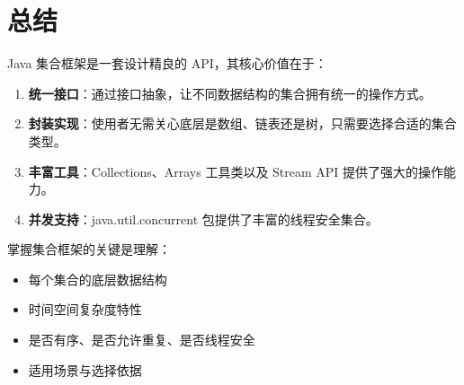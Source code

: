 
\section{总结}
Java 集合框架是一套设计精良的 API，其核心价值在于：

\begin{enumerate}
    \item \textbf{统一接口}：通过接口抽象，让不同数据结构的集合拥有统一的操作方式。
    \item \textbf{封装实现}：使用者无需关心底层是数组、链表还是树，只需要选择合适的集合类型。
    \item \textbf{丰富工具}：Collections、Arrays 工具类以及 Stream API 提供了强大的操作能力。
    \item \textbf{并发支持}：java.util.concurrent 包提供了丰富的线程安全集合。
\end{enumerate}

掌握集合框架的关键是理解：
\begin{itemize}
    \item 每个集合的底层数据结构
    \item 时间空间复杂度特性
    \item 是否有序、是否允许重复、是否线程安全
    \item 适用场景与选择依据
\end{itemize}
